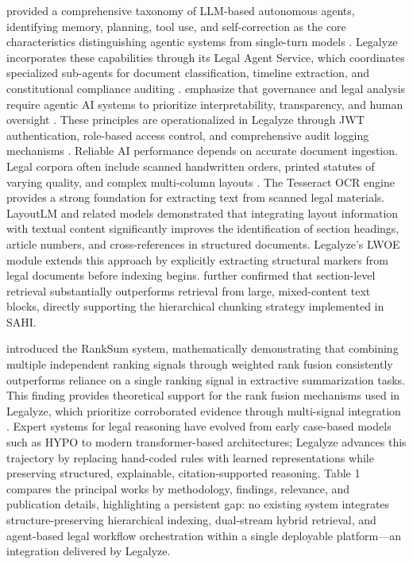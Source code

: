 \documentclass[a4paper,fleqn]{cas-dc}
\begin{document}
\citet{24} provided a comprehensive taxonomy of LLM-based autonomous agents, identifying memory, planning, tool use, and self-correction as the core characteristics distinguishing agentic systems from single-turn models \citep{27}. Legalyze incorporates these capabilities through its Legal Agent Service, which coordinates specialized sub-agents for document classification, timeline extraction, and constitutional compliance auditing \citep{28}. \citet{19} emphasize that governance and legal analysis require agentic AI systems to prioritize interpretability, transparency, and human oversight \citep{29}. These principles are operationalized in Legalyze through JWT authentication, role-based access control, and comprehensive audit logging mechanisms \citep{30}. Reliable AI performance depends on accurate document ingestion. Legal corpora often include scanned handwritten orders, printed statutes of varying quality, and complex multi-column layouts \citep{21}. The Tesseract OCR engine \citep{22} provides a strong foundation for extracting text from scanned legal materials. LayoutLM \citep{26} and related models demonstrated that integrating layout information with textual content significantly improves the identification of section headings, article numbers, and cross-references in structured documents. Legalyze’s LWOE module extends this approach by explicitly extracting structural markers from legal documents before indexing begins. \citet{20} further confirmed that section-level retrieval substantially outperforms retrieval from large, mixed-content text blocks, directly supporting the hierarchical chunking strategy implemented in SAHI.

\citet{11} introduced the RankSum system, mathematically demonstrating that combining multiple independent ranking signals through weighted rank fusion consistently outperforms reliance on a single ranking signal in extractive summarization tasks. This finding provides theoretical support for the rank fusion mechanisms used in Legalyze, which prioritize corroborated evidence through multi-signal integration \citep{31, 32}. Expert systems for legal reasoning have evolved from early case-based models such as HYPO \citep{1} to modern transformer-based architectures; Legalyze advances this trajectory by replacing hand-coded rules with learned representations while preserving structured, explainable, citation-supported reasoning. Table 1 compares the principal works by methodology, findings, relevance, and publication details, highlighting a persistent gap: no existing system integrates structure-preserving hierarchical indexing, dual-stream hybrid retrieval, and agent-based legal workflow orchestration within a single deployable platform—an integration delivered by Legalyze.
\end{document}
